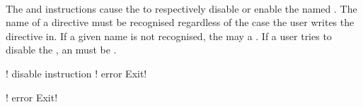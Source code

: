  \\

The  and  instructions cause the  to respectively disable or enable the named . The name of a directive must be recognised regardless of the case the user writes the directive in. If a given name is not recognised, the  may  a . If a user tries to disable the  , an  must be . \\

\begin{examples}
\begin{examplesource}
! disable instruction
! error Exit!
\end{examplesource}
  \begin{exampleoutput}
    ! error Exit!
  \end{exampleoutput}
\end{examples}

